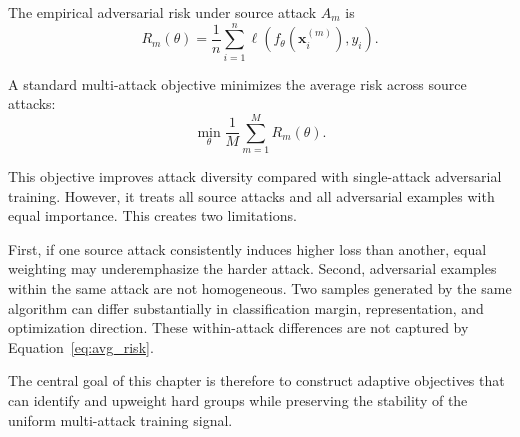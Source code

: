 The empirical adversarial risk under source attack \(A_m\) is
\begin{equation}
    R_m(\theta)
    =
    \frac{1}{n}
    \sum_{i=1}^{n}
    \ell\!\left(
        f_\theta\!\left(\mathbf{x}_i^{(m)}\right),
        y_i
    \right).
\end{equation}

A standard multi-attack objective minimizes the average risk across source attacks:
\begin{equation}
    \min_\theta
    \frac{1}{M}
    \sum_{m=1}^{M}
    R_m(\theta).
    \label{eq:avg_risk}
\end{equation}

This objective improves attack diversity compared with single-attack adversarial
training. However, it treats all source attacks and all adversarial examples with equal
importance. This creates two limitations.

First, if one source attack consistently induces higher loss than another, equal
weighting may underemphasize the harder attack. Second, adversarial examples within
the same attack are not homogeneous. Two samples generated by the same algorithm can
differ substantially in classification margin, representation, and optimization
direction. These within-attack differences are not captured by
Equation~\eqref{eq:avg_risk}.

The central goal of this chapter is therefore to construct adaptive objectives that can
identify and upweight hard groups while preserving the stability of the uniform
multi-attack training signal.

